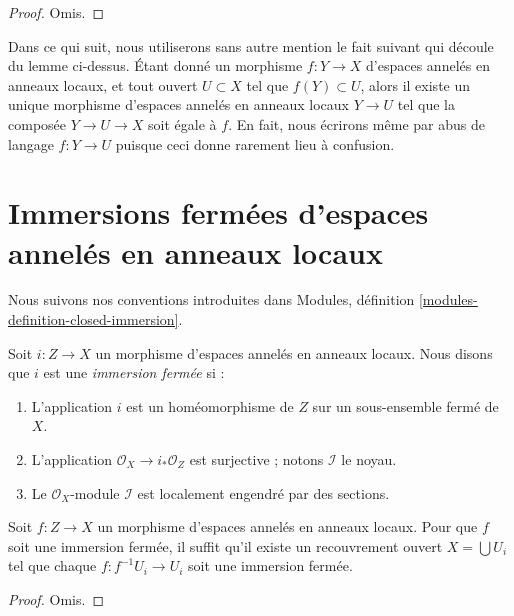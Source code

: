 \begin{proof}
Omis.
\end{proof}

\noindent
Dans ce qui suit, nous utiliserons sans autre mention le fait suivant
qui découle du lemme ci-dessus. Étant donné un morphisme $f :
Y \to X$ d'espaces annelés en anneaux locaux, et tout ouvert
$U \subset X$ tel que $f(Y) \subset U$, alors il existe un unique
morphisme d'espaces annelés en anneaux locaux $Y \to U$ tel
que la composée $Y \to U \to X$ soit égale à $f$. En fait, nous
écrirons même par abus de langage $f : Y \to U$ puisque ceci donne
rarement lieu à confusion.









\section{Immersions fermées d'espaces annelés en anneaux locaux}
\label{section-closed-immersion}

\noindent
Nous suivons nos conventions introduites
dans Modules, définition \ref{modules-definition-closed-immersion}.

\begin{definition}
\label{definition-closed-immersion-locally-ringed-spaces}
Soit $i : Z \to X$ un morphisme d'espaces annelés en anneaux locaux.
Nous disons que $i$ est une {\it immersion fermée} si :
\begin{enumerate}
\item L'application $i$ est un homéomorphisme de $Z$ sur un sous-ensemble fermé
de $X$. \item L'application $\mathcal{O}_X \to i_*\mathcal{O}_Z$ est
surjective ; notons $\mathcal{I}$ le noyau.
\item Le $\mathcal{O}_X$-module $\mathcal{I}$ est
localement engendré par des sections.
\end{enumerate}
\end{definition}

\begin{lemma}
\label{lemma-closed-local-target}
Soit $f : Z \to X$ un morphisme d'espaces annelés en anneaux
locaux. Pour que $f$ soit une immersion fermée, il suffit
qu'il existe un recouvrement ouvert $X = \bigcup U_i$ tel que
chaque $f : f^{-1}U_i \to U_i$ soit une immersion fermée.
\end{lemma}

\begin{proof}
Omis.
\end{proof}

